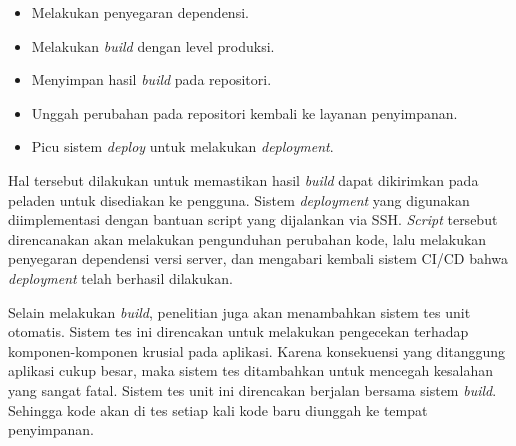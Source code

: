     \begin{itemize}
        \item Melakukan penyegaran dependensi.
        \item Melakukan \textit{build} dengan level produksi.
        \item Menyimpan hasil \textit{build} pada repositori.
        \item Unggah perubahan pada repositori kembali ke layanan penyimpanan.
        \item Picu sistem \textit{deploy} untuk melakukan \textit{deployment}.
    \end{itemize}
    
    Hal tersebut dilakukan untuk memastikan hasil \textit{build} dapat
    dikirimkan pada peladen untuk disediakan ke pengguna. Sistem
    \textit{deployment} yang digunakan diimplementasi dengan bantuan script yang
    dijalankan via SSH. \textit{Script} tersebut direncanakan akan melakukan
    pengunduhan perubahan kode, lalu melakukan penyegaran dependensi versi
    server, dan mengabari kembali sistem CI/CD bahwa \textit{deployment} telah
    berhasil dilakukan.
    
    Selain melakukan \textit{build}, penelitian juga akan menambahkan sistem tes
    unit otomatis. Sistem tes ini direncakan untuk melakukan pengecekan terhadap
    komponen-komponen krusial pada aplikasi. Karena konsekuensi yang ditanggung
    aplikasi cukup besar, maka sistem tes ditambahkan untuk mencegah kesalahan
    yang sangat fatal. Sistem tes unit ini direncakan berjalan bersama sistem
    \textit{build}. Sehingga kode akan di tes setiap kali kode baru diunggah ke
    tempat penyimpanan.
